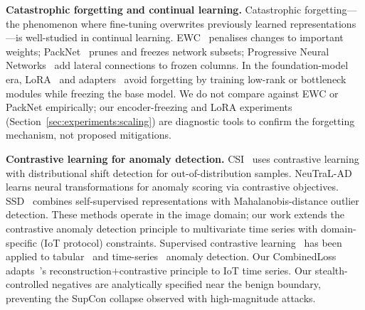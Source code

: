 \textbf{Catastrophic forgetting and continual learning.}
Catastrophic forgetting---the phenomenon where fine-tuning overwrites
previously learned representations---is well-studied in continual
learning.  EWC~\cite{kirkpatrick2017ewc} penalises changes to important
weights; PackNet~\cite{mallya2018packnet} prunes and freezes network
subsets; Progressive Neural Networks~\cite{rusu2016progressive} add
lateral connections to frozen columns.  In the foundation-model era,
LoRA~\cite{hu2022lora} and adapters~\cite{houlsby2019adapters} avoid
forgetting by training low-rank or bottleneck modules while freezing
the base model.  We do not compare against EWC or PackNet empirically; our encoder-freezing
and LoRA experiments (Section~\ref{sec:experiments:scaling}) are diagnostic
tools to confirm the forgetting mechanism, not proposed mitigations.

\textbf{Contrastive learning for anomaly detection.}
CSI~\cite{tack2020csi} uses contrastive learning with distributional
shift detection for out-of-distribution samples.
NeuTraL-AD~\cite{qiu2021neutral} learns neural transformations for
anomaly scoring via contrastive objectives.
SSD~\cite{sehwag2021ssd} combines self-supervised representations with
Mahalanobis-distance outlier detection.
These methods operate in the image domain; our work extends the
contrastive anomaly detection principle to multivariate time series
with domain-specific (IoT protocol) constraints.
Supervised contrastive learning~\cite{khosla2020supcon} has been applied
to tabular~\cite{sohn2020fixmatch} and time-series~\cite{eldele2021ts2vec}
anomaly detection.  Our CombinedLoss adapts~\cite{reiss2021panda}'s
reconstruction$+$contrastive principle to IoT time series.
Our stealth-controlled negatives are analytically specified near the benign boundary,
preventing the SupCon collapse observed with high-magnitude attacks.

